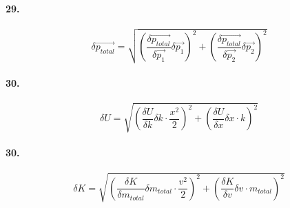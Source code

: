     \paragraph*{29.}

    \begin{equation*}
        \delta \vec{p_{total}} = \sqrt{\left(\frac{\delta \vec{p_{total}}}{\delta \vec{p_1}}\delta \vec{p_1}\right)^2 + \left(\frac{\delta \vec{p_{total}}}{\delta \vec{p_2}}\delta \vec{p_2} \right)^2}
    \end{equation*}

    \paragraph*{30.}

    \begin{equation*}
        \delta U = \sqrt{\left(\frac{\delta U}{\delta k}\delta k \cdot \frac{x^2}{2}\right)^2 + \left(\frac{\delta U}{\delta x}\delta x \cdot k \right)^2}
    \end{equation*}

    \paragraph*{30.}

    \begin{equation*}
        \delta K = \sqrt{\left(\frac{\delta K}{\delta m_{total}}\delta m_{total} \cdot \frac{v^2}{2}\right)^2 + \left(\frac{\delta K}{\delta v}\delta v \cdot m_{total} \right)^2}
    \end{equation*}

